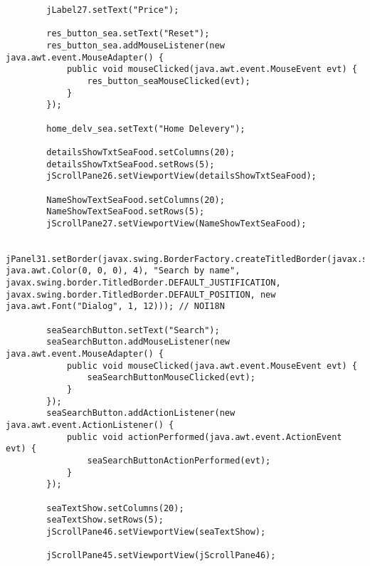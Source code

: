 \documentclass[12pt,a4paper]{article}
\begin{document}
\begin{lstlisting}
        jLabel27.setText("Price");

        res_button_sea.setText("Reset");
        res_button_sea.addMouseListener(new java.awt.event.MouseAdapter() {
            public void mouseClicked(java.awt.event.MouseEvent evt) {
                res_button_seaMouseClicked(evt);
            }
        });

        home_delv_sea.setText("Home Delevery");

        detailsShowTxtSeaFood.setColumns(20);
        detailsShowTxtSeaFood.setRows(5);
        jScrollPane26.setViewportView(detailsShowTxtSeaFood);

        NameShowTextSeaFood.setColumns(20);
        NameShowTextSeaFood.setRows(5);
        jScrollPane27.setViewportView(NameShowTextSeaFood);

        jPanel31.setBorder(javax.swing.BorderFactory.createTitledBorder(javax.swing.BorderFactory.createLineBorder(new java.awt.Color(0, 0, 0), 4), "Search by name", javax.swing.border.TitledBorder.DEFAULT_JUSTIFICATION, javax.swing.border.TitledBorder.DEFAULT_POSITION, new java.awt.Font("Dialog", 1, 12))); // NOI18N

        seaSearchButton.setText("Search");
        seaSearchButton.addMouseListener(new java.awt.event.MouseAdapter() {
            public void mouseClicked(java.awt.event.MouseEvent evt) {
                seaSearchButtonMouseClicked(evt);
            }
        });
        seaSearchButton.addActionListener(new java.awt.event.ActionListener() {
            public void actionPerformed(java.awt.event.ActionEvent evt) {
                seaSearchButtonActionPerformed(evt);
            }
        });

        seaTextShow.setColumns(20);
        seaTextShow.setRows(5);
        jScrollPane46.setViewportView(seaTextShow);

        jScrollPane45.setViewportView(jScrollPane46);


\end{lstlisting}
\end{document}
